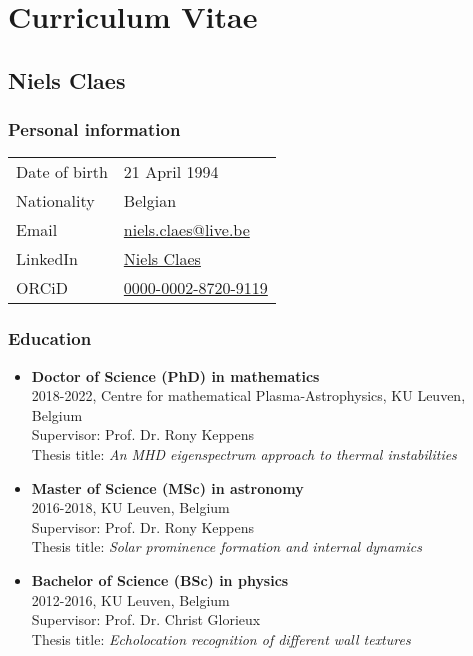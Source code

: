 \chapter*{Curriculum Vitae}\label{ch: curriculum}

\vspace{-20pt}
\section*{Niels Claes}
\subsection*{Personal information}
\begin{tabular}[t]{ll}
  Date of birth & 21 April 1994  \\
  Nationality   & Belgian \\
  Email         & \href{mailto:niels.claes@live.be}{niels.claes@live.be} \\
  LinkedIn      & \href{https://www.linkedin.com/in/niels-claes-611140123/}{Niels Claes} \\
  ORCiD         & \href{https://orcid.org/0000-0002-8720-9119}{0000-0002-8720-9119}
\end{tabular}

\subsection*{Education}
\begin{itemize}
  \item[] \textbf{Doctor of Science (PhD) in mathematics} \hfill \\
  2018-2022, Centre for mathematical Plasma-Astrophysics, KU Leuven, Belgium \hfill \\
  Supervisor: Prof. Dr. Rony Keppens \hfill \\
  Thesis title: \emph{An MHD eigenspectrum approach to thermal instabilities}

  \item[] \textbf{Master of Science (MSc) in astronomy} \hfill \\
  2016-2018, KU Leuven, Belgium \hfill \\
  Supervisor: Prof. Dr. Rony Keppens \hfill \\
  Thesis title: \emph{Solar prominence formation and internal dynamics}

  \item[] \textbf{Bachelor of Science (BSc) in physics} \hfill \\
  2012-2016, KU Leuven, Belgium \hfill \\
  Supervisor: Prof. Dr. Christ Glorieux \hfill \\
  Thesis title: \emph{Echolocation recognition of different wall textures}
\end{itemize}



